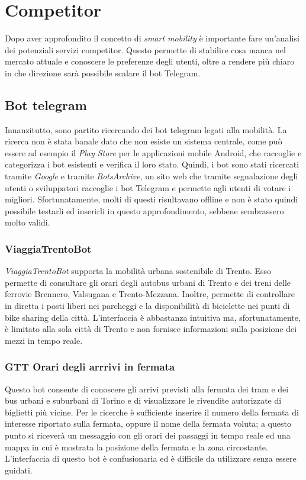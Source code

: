 \section{Competitor}
\label{sec:competitor}

Dopo aver approfondito il concetto di \textit{smart mobility} è importante fare un'analisi dei potenziali servizi competitor. Questo permette di stabilire cosa manca nel mercato attuale e conoscere le preferenze degli utenti, oltre a rendere più chiaro in che direzione sarà possibile scalare il bot Telegram.

\subsection{Bot telegram}
Innanzitutto, sono partito ricercando dei bot telegram legati alla mobilità. La ricerca non è stata banale dato che non esiste un sistema centrale, come può essere ad esempio il \textit{Play Store} per le applicazioni mobile Android, che raccoglie e categorizza i bot esistenti e verifica il loro stato. Quindi, i bot sono stati ricercati tramite \textit{Google} e tramite \textit{BotsArchive}, un sito web che tramite segnalazione degli utenti o sviluppatori raccoglie i bot Telegram e permette agli utenti di votare i migliori. Sfortunatamente, molti di questi risultavano offline e non è stato quindi possibile testarli ed inserirli in questo approfondimento, sebbene sembrassero molto validi.

\subsubsection{ViaggiaTrentoBot}

\textit{ViaggiaTrentoBot} supporta la mobilità urbana sostenibile di Trento. Esso permette di consultare gli orari degli autobus urbani di Trento e dei treni delle ferrovie Brennero, Valsugana e Trento-Mezzana. Inoltre, permette di controllare in diretta i posti liberi nei parcheggi e la disponibilità di biciclette nei punti di bike sharing della città. L'interfaccia è abbastanza intuitiva ma, sfortunatamente, è limitato alla sola città di Trento e non fornisce informazioni sulla posizione dei mezzi in tempo reale.

\subsubsection{GTT Orari degli arrrivi in fermata}
Questo bot consente di conoscere gli arrivi previsti alla fermata dei tram e dei bus urbani e suburbani di Torino e di visualizzare le rivendite autorizzate di biglietti più vicine. Per le ricerche è sufficiente inserire il numero della fermata di interesse riportato sulla fermata, oppure il nome della fermata voluta; a questo punto si riceverà un messaggio con gli orari dei passaggi in tempo reale ed una mappa in cui è mostrata la posizione della fermata e la zona circostante. L'interfaccia di questo bot è confusionaria ed è difficile da utilizzare senza essere guidati.

